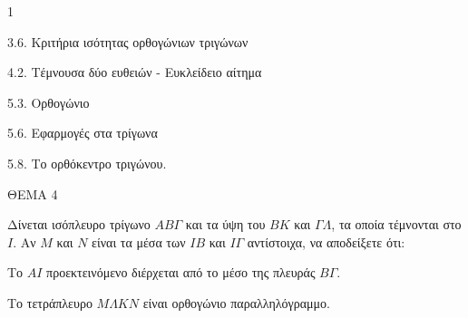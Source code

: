 \begin{ylh}{1}
    \item 3.6. Κριτήρια ισότητας ορθογώνιων τριγώνων
    \item 4.2. Τέμνουσα δύο ευθειών - Ευκλείδειο αίτημα
    \item 5.3. Ορθογώνιο
    \item 5.6. Εφαρμογές στα τρίγωνα
    \item 5.8. Το ορθόκεντρο τριγώνου.
\end{ylh}

ΘΕΜΑ 4

Δίνεται ισόπλευρο τρίγωνο $ΑΒ\Gamma$ και τα ύψη του $BK$ και $\Gamma\Lambda$, τα οποία τέμνονται στο $I$. Αν $M$ και $N$ είναι τα μέσα των $IB$ και $I\Gamma$ αντίστοιχα, να αποδείξετε ότι:

\begin{alist}
\item Το $AI$ προεκτεινόμενο διέρχεται από το μέσο της πλευράς $B\Gamma$. 
\item Το τετράπλευρο $M\Lambda KN$ είναι ορθογώνιο παραλληλόγραμμο. 

\begin{center}
\end{center}
\end{alist}
